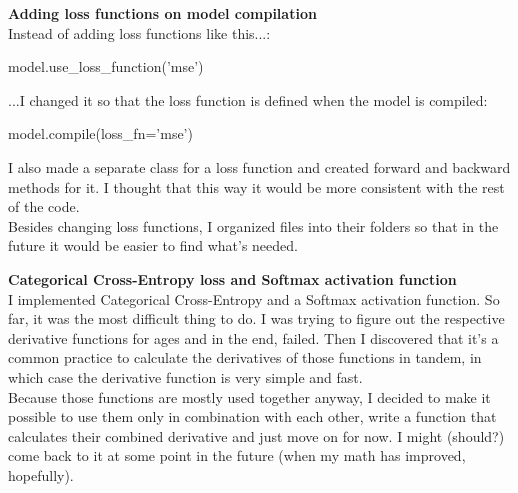 \documentclass{article}
\begin{document}
\textbf{Adding loss functions on model compilation} \\

Instead of adding loss functions like this...:
\begin{python}
model.use_loss_function('mse')
\end{python}

...I changed it so that the loss function is defined when the model is compiled:
\begin{python}
model.compile(loss_fn='mse')
\end{python}

I also made a separate class for a loss function and created forward and backward methods for it. I thought 
that this way it would be more consistent with the rest of the code. \\

Besides changing loss functions, I organized files into their folders so that in the future it would be easier
to find what's needed.

\textbf{Categorical Cross-Entropy loss and Softmax activation function} \\

I implemented Categorical Cross-Entropy and a Softmax activation function. So far, it was the 
most difficult thing to do. I was trying to figure out the respective derivative functions for ages 
and in the end, failed. Then I discovered that it's a common practice to calculate the derivatives of 
those functions in tandem, in which case the derivative function is very simple and fast. \\

Because those functions are mostly used together anyway, I decided to make it possible to use them 
only in combination with each other, write a function that calculates their combined derivative and 
just move on for now. I might (should?) come back to it at some point in the future (when my math 
has improved, hopefully).
\end{document}
